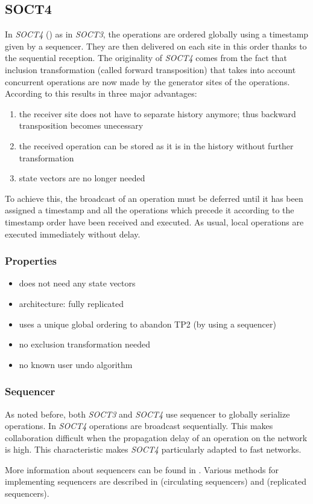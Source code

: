 \subsection{SOCT4}
\label{algo:soct4}

In \emph{SOCT4} (\cite{suleiman00}) as in \emph{SOCT3}, the operations are ordered globally using a timestamp given by a sequencer. They are then delivered on each site in this order thanks to the sequential reception. The originality of \emph{SOCT4} comes from the fact that inclusion transformation (called forward transposition) that takes into account concurrent operations are now made by the generator sites of the operations. According to \cite{suleiman00} this results in three major advantages:

\begin{enumerate}
 \item the receiver site does not have to separate history anymore; 
       thus backward transposition becomes unecessary
 \item the received operation can be stored as it is in the history
       without further transformation
 \item state vectors are no longer needed
\end{enumerate}

To achieve this, the broadcast of an operation must be deferred until it has been assigned a timestamp and all the operations which precede it according to the timestamp order have been received and executed. As usual, local operations are executed immediately without delay.


\subsubsection{Properties}
\begin{itemize}
 \item does not need any state vectors
 \item architecture: fully replicated
 \item uses a unique global ordering to abandon TP2 (by using a sequencer)
 \item no exclusion transformation needed
 \item no known user undo algorithm
\end{itemize}


\subsubsection{Sequencer}
\label{sequencer}
As noted before, both \emph{SOCT3} and \emph{SOCT4} use sequencer to globally serialize operations. In \emph{SOCT4} operations are broadcast sequentially. This makes collaboration difficult when the propagation delay of an operation on the network is high. This characteristic makes \emph{SOCT4} particularly adapted to fast networks.

More information about sequencers can be found in \cite{reed79}. Various methods for implementing sequencers are described in \cite{lelann78} (circulating sequencers) and \cite{banino79} (replicated sequencers).
